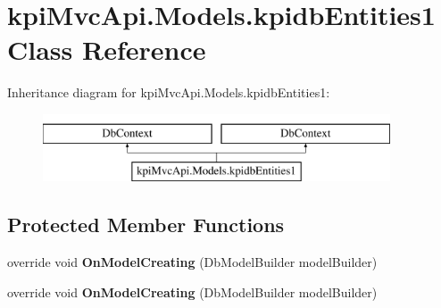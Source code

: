 \hypertarget{classkpi_mvc_api_1_1_models_1_1kpidb_entities1}{}\section{kpi\+Mvc\+Api.\+Models.\+kpidb\+Entities1 Class Reference}
\label{classkpi_mvc_api_1_1_models_1_1kpidb_entities1}
Inheritance diagram for kpi\+Mvc\+Api.\+Models.\+kpidb\+Entities1\+:\begin{figure}[H]
\begin{center}
\leavevmode
\includegraphics[height=2.000000cm]{classkpi_mvc_api_1_1_models_1_1kpidb_entities1}
\end{center}
\end{figure}
\subsection*{Protected Member Functions}
\begin{DoxyCompactItemize}
\item 
\mbox{\label{classkpi_mvc_api_1_1_models_1_1kpidb_entities1_a08bd4559ef70af9b3d494f820e87f8f2}} 
override void {\bfseries On\+Model\+Creating} (Db\+Model\+Builder model\+Builder)
\item 
\mbox{\label{classkpi_mvc_api_1_1_models_1_1kpidb_entities1_a08bd4559ef70af9b3d494f820e87f8f2}} 
override void {\bfseries On\+Model\+Creating} (Db\+Model\+Builder model\+Builder)
\end{DoxyCompactItemize}
